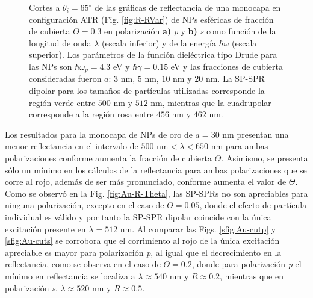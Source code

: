 \begin{figure}[h!]
	\caption{Cortes a $\theta_i = 65^\circ$ de las gráficas de reflectancia de una monocapa en configuración ATR (Fig. \ref{fig:R-RVar}) de NPs esféricas de fracción de cubierta $\Theta = 0.3$ en polarización \textbf{a)} \emph{p} y \textbf{b)} \emph{s} como función de la longitud de onda $\lambda$ (escala inferior) y de la energía $\hbar\omega$ (escala superior). Los parámetros de la función dieléctrica tipo Drude para las NPs son $\hbar\omega_p = 4.3$ eV y $\hbar\gamma = 0.15$ eV y las fracciones de cubierta consideradas fueron $a$: $3$ nm, $5$ nm, $10$ nm y $20$ nm. La SP-SPR dipolar para los tamaños de partículas utilizadas corresponde la región verde entre $500$ nm y $512$ nm, mientras que la cuadrupolar corresponde a la región rosa entre $456$ nm y $462$ nm.}\label{fig:AuAg-Cuts}
	\end{figure}	

Los resultados para la monocapa de NPs de oro de $a=30$ nm presentan una menor reflectancia en el intervalo de $500$ nm$<\lambda<650$ nm para ambas polarizaciones conforme aumenta la fracción de cubierta $\Theta$. Asimismo, se presenta sólo un mínimo en los cálculos de la reflectancia para ambas polarizaciones que se corre al rojo, además de ser más pronunciado, conforme aumenta el valor de $\Theta$. Como se observó en la Fig. \ref{fig:Au-R-Theta}, las SP-SPRs no son apreciables para ninguna polarización, excepto en el caso de $\Theta =0.05$, donde el efecto de partícula individual es válido y por tanto la SP-SPR dipolar coincide con la única excitación presente en $\lambda = 512$ nm. Al comparar las Figs. \ref{sfig:Au-cutp} y \ref{sfig:Au-cuts} se corrobora que el corrimiento al rojo de la única excitación apreciable  es mayor para polarización \emph{p}, al igual que el decrecimiento en la reflectancia, como se observa en el caso de $\Theta=0.2$, donde para polarización \emph{p} el mínimo en reflectancia se localiza a $\lambda\approx  540$ nm  y $R \approx 0.2$, mientras que en polarización \emph{s}, $\lambda\approx 520$ nm y $R\approx 0.5$.

